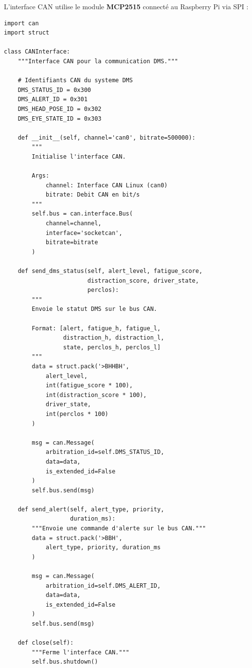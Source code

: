 \documentclass[12pt,a4paper,twoside]{report}
\begin{document}
L'interface CAN utilise le module \textbf{MCP2515} connecté au Raspberry Pi via SPI :

\begin{lstlisting}[style=pythonstyle, caption={Interface CAN pour le prototype robot.}, label={lst:can_interface}]
import can
import struct

class CANInterface:
    """Interface CAN pour la communication DMS."""
    
    # Identifiants CAN du systeme DMS
    DMS_STATUS_ID = 0x300
    DMS_ALERT_ID = 0x301
    DMS_HEAD_POSE_ID = 0x302
    DMS_EYE_STATE_ID = 0x303
    
    def __init__(self, channel='can0', bitrate=500000):
        """
        Initialise l'interface CAN.
        
        Args:
            channel: Interface CAN Linux (can0)
            bitrate: Debit CAN en bit/s
        """
        self.bus = can.interface.Bus(
            channel=channel,
            interface='socketcan',
            bitrate=bitrate
        )
    
    def send_dms_status(self, alert_level, fatigue_score,
                        distraction_score, driver_state,
                        perclos):
        """
        Envoie le statut DMS sur le bus CAN.
        
        Format: [alert, fatigue_h, fatigue_l, 
                 distraction_h, distraction_l,
                 state, perclos_h, perclos_l]
        """
        data = struct.pack('>BHHBH',
            alert_level,
            int(fatigue_score * 100),
            int(distraction_score * 100),
            driver_state,
            int(perclos * 100)
        )
        
        msg = can.Message(
            arbitration_id=self.DMS_STATUS_ID,
            data=data,
            is_extended_id=False
        )
        self.bus.send(msg)
    
    def send_alert(self, alert_type, priority, 
                   duration_ms):
        """Envoie une commande d'alerte sur le bus CAN."""
        data = struct.pack('>BBH',
            alert_type, priority, duration_ms
        )
        
        msg = can.Message(
            arbitration_id=self.DMS_ALERT_ID,
            data=data,
            is_extended_id=False
        )
        self.bus.send(msg)
    
    def close(self):
        """Ferme l'interface CAN."""
        self.bus.shutdown()
\end{lstlisting}
\end{document}
